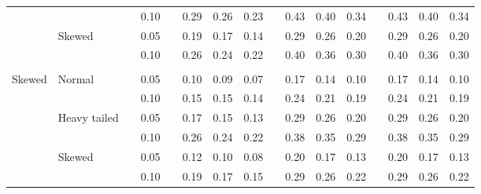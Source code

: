 \documentclass{article} %
\begin{document}
\begin{table}[ht]
\begin{scriptsize}
\begin{center}
\begin{tabular}{ll p{.1cm} c p{.1cm} rrr p{.1cm} rrr p{.1cm} rrr}
             &              && 0.10 &&   0.29 & 0.26 & 0.23 && 0.43 & 0.40 & 0.34 && 0.43 & 0.40 & 0.34 \\ 
             & Skewed       && 0.05 &&   0.19 & 0.17 & 0.14 && 0.29 & 0.26 & 0.20 && 0.29 & 0.26 & 0.20 \\ 
             &              && 0.10 &&   0.26 & 0.24 & 0.22 && 0.40 & 0.36 & 0.30 && 0.40 & 0.36 & 0.30 \\ 
             &&&&&&&&&&&&&&&\\
Skewed       & Normal       && 0.05 &&   0.10 & 0.09 & 0.07 && 0.17 & 0.14 & 0.10 && 0.17 & 0.14 & 0.10 \\ 
             &              && 0.10 &&   0.15 & 0.15 & 0.14 && 0.24 & 0.21 & 0.19 && 0.24 & 0.21 & 0.19 \\ 
             & Heavy tailed && 0.05 &&   0.17 & 0.15 & 0.13 && 0.29 & 0.26 & 0.20 && 0.29 & 0.26 & 0.20 \\ 
             &              && 0.10 &&   0.26 & 0.24 & 0.22 && 0.38 & 0.35 & 0.29 && 0.38 & 0.35 & 0.29 \\ 
             & Skewed       && 0.05 &&   0.12 & 0.10 & 0.08 && 0.20 & 0.17 & 0.13 && 0.20 & 0.17 & 0.13 \\ 
             &              && 0.10 &&   0.19 & 0.17 & 0.15 && 0.29 & 0.26 & 0.22 && 0.29 & 0.26 & 0.22 \\ 



\end{tabular}
\end{center}
\end{scriptsize}
\end{table}
\end{document}
